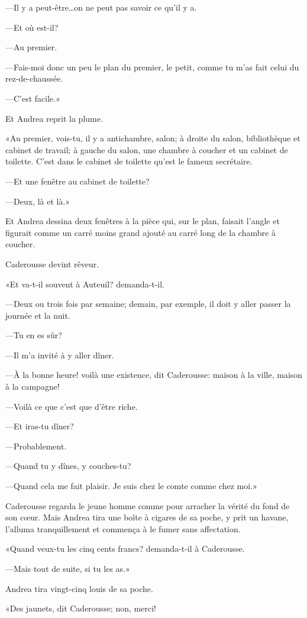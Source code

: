 —Il y a peut-être\dots on ne peut pas savoir ce qu'il y a. 

—Et où est-il? 

—Au premier. 

—Fais-moi donc un peu le plan du premier, le petit, comme tu m'as fait celui du rez-de-chaussée. 

—C'est facile.» 

Et Andrea reprit la plume. 

«Au premier, vois-tu, il y a antichambre, salon; à droite du salon, bibliothèque et cabinet de travail; à gauche du salon, une chambre à coucher et un cabinet de toilette. C'est dans le cabinet de toilette qu'est le fameux secrétaire. 

—Et une fenêtre au cabinet de toilette? 

—Deux, là et là.» 

Et Andrea dessina deux fenêtres à la pièce qui, sur le plan, faisait l'angle et figurait comme un carré moins grand ajouté au carré long de la chambre à coucher. 

Caderousse devint rêveur. 

«Et va-t-il souvent à Auteuil? demanda-t-il. 

—Deux ou trois fois par semaine; demain, par exemple, il doit y aller passer la journée et la nuit. 

—Tu en es sûr? 

—Il m'a invité à y aller dîner. 

—À la bonne heure! voilà une existence, dit Caderousse: maison à la ville, maison à la campagne! 

—Voilà ce que c'est que d'être riche. 

—Et iras-tu dîner? 

—Probablement. 

—Quand tu y dînes, y couches-tu?  

—Quand cela me fait plaisir. Je suis chez le comte comme chez moi.» 

Caderousse regarda le jeune homme comme pour arracher la vérité du fond de son cœur. Mais Andrea tira une boîte à cigares de sa poche, y prit un havane, l'alluma tranquillement et commença à le fumer sans affectation. 

«Quand veux-tu les cinq cents francs? demanda-t-il à Caderousse. 

—Mais tout de suite, si tu les as.» 

Andrea tira vingt-cinq louis de sa poche. 

«Des jaunets, dit Caderousse; non, merci! 

